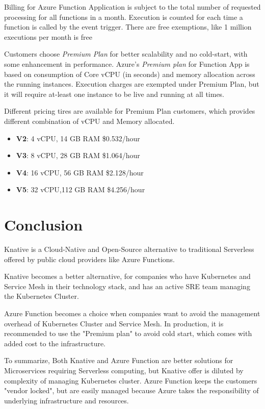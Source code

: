 \documentclass{article}
\begin{document}
\begin{flushleft}
Billing for Azure Function Application is subject to the total number of requested processing for all functions in a month. Execution is counted for each time a function is called by the event trigger. There are free exemptions, like 1 million executions per month is free
\par
Customers choose \textit{Premium Plan} for better scalability and no cold-start, with some enhancement in performance. Azure's \textit{Premium plan} for Function App is based on consumption of Core vCPU (in seconds) and memory allocation across the running instances.
\hfill\break
Execution charges are exempted under Premium Plan, but it will require at-least one instance to be live and running at all times.
\par
Different pricing tires are available for Premium Plan customers, which provides different combination of vCPU and Memory allocated.
\begin{itemize}
    \item \textbf{V2}: 4 vCPU,  14 GB RAM \$0.532/hour
    \item \textbf{V3}: 8 vCPU,  28 GB RAM \$1.064/hour
    \item \textbf{V4}: 16 vCPU, 56 GB RAM \$2.128/hour
    \item \textbf{V5}: 32 vCPU,112 GB RAM \$4.256/hour
\end{itemize}
\par
\end{flushleft}
\pagebreak
\section*{Conclusion}
\begin{flushleft}
Knative is a Cloud-Native and Open-Source alternative to traditional Serverless offered by public cloud providers like Azure Functions.
\par
Knative becomes a better alternative, for companies who have Kubernetes and Service Mesh in their technology stack, and has an active SRE team managing the Kubernetes Cluster. 
\par
Azure Function becomes a choice when companies want to avoid the management overhead of Kubernetes Cluster and Service Mesh. In production, it is recommended to use the "Premium plan" to avoid cold start, which comes with added cost to the infrastructure. 
\par
To summarize, Both Knative and Azure Function are better solutions for Microservices requiring Serverless computing, but Knative offer is diluted by complexity of managing Kubernetes cluster. Azure Function keeps the customers "vendor locked", but are easily managed because Azure takes the responsibility of underlying infrastructure and resources.

\end{flushleft}

\pagebreak

\printbibliography
\end{document}
